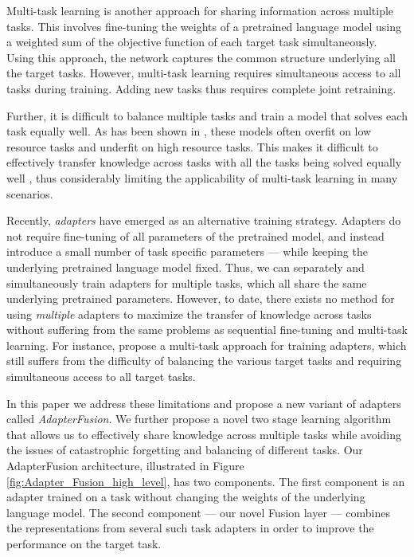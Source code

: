 Multi-task learning \cite{caruana1997multitask, zhang2017survey, liu2019multi} is another approach for sharing information across multiple tasks. This involves fine-tuning the weights of a pretrained language model using a weighted sum of the objective function of each target task simultaneously. Using this approach, the network captures the common structure underlying all the target tasks. However, multi-task learning requires simultaneous access to all tasks during training. Adding new tasks thus requires complete joint retraining. 

Further, it is difficult to balance multiple tasks and train a model that solves each task equally well. As has been shown in \citet{lee2017fully}, these models often overfit on low resource tasks and underfit on high resource tasks. This makes it difficult to effectively transfer knowledge across tasks with all the tasks being solved equally well \cite{pfeiffer20multilabel}, thus considerably limiting the applicability of multi-task learning in many scenarios. 

Recently, \emph{adapters} \cite{rebuffi2017learning, houlsby2019parameter} have emerged as an alternative training strategy. Adapters do not require fine-tuning of all parameters of the pretrained model, and instead introduce a small number of task specific parameters --- while keeping the underlying pretrained language model fixed. Thus, we can separately and simultaneously train adapters for multiple tasks, which all share the same underlying pretrained parameters. However, to date, there exists no method for using \emph{multiple} adapters to maximize the transfer of knowledge across tasks without suffering from the same problems as sequential fine-tuning and multi-task learning. For instance,
\citet{stickland2019bert} propose a multi-task approach for training adapters, which still suffers from the difficulty of balancing the various target tasks and requiring simultaneous access to all target tasks.

In this paper we address these limitations and propose a new variant of adapters called \emph{AdapterFusion}. We further propose a novel two stage learning algorithm that allows us to effectively share knowledge across multiple tasks while avoiding the issues of catastrophic forgetting and balancing of different tasks. Our AdapterFusion architecture, illustrated in Figure \ref{fig:Adapter_Fusion_high_level}, has two components. The first component is an adapter trained on a task without changing the weights of the underlying language model. The second component --- our novel Fusion layer --- combines the representations from several such task adapters in order to improve the performance on the target task.

